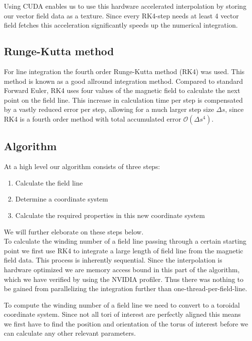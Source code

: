 \documentclass{article}
\renewcommand{\O}[1]{\ensuremath{\mathcal{O}\left(#1\right)}}
\begin{document}
Using CUDA enables us to use this hardware accelerated interpolation by storing our vector field data as a texture. Since every RK4-step needs at least 4 vector field fetches this acceleration significantly speeds up the numerical integration. %

\subsection{Runge-Kutta method}
For line integration the fourth order Runge-Kutta method (RK4) was used.  This method is known as a good allround integration method. Compared to standard Forward Euler, RK4 uses four values of the magnetic field to calculate the next point on the field line. This increase in calculation time per step is compensated by a vastly reduced error per step, allowing for a much larger step size $\Delta s$, since RK4 is a fourth order method with total accumulated error $\O{\Delta s^4}$.

\subsection{Algorithm}
At a high level our algorithm consists of three steps: 
\begin{enumerate}
	\item Calculate the field line
	\item Determine a coordinate system
	\item Calculate the required properties in this new coordinate system
\end{enumerate}
We will further eleborate on these steps below.\\

To calculate the winding number of a field line passing through a certain starting point we first use RK4 to integrate a large length of field line from the magnetic field data. This process is inherently sequential.
Since the interpolation is hardware optimized we are memory access bound in this part of the algorithm, which we have verified by using the NVIDIA profiler. Thus there was nothing to be gained from parallelizing the integration further than one-thread-per-field-line.

To compute the winding number of a field line we need to convert to a toroidal coordinate system. Since not all tori of interest are perfectly aligned this means we first have to find the position and orientation of the torus of interest before we can calculate any other relevant parameters.
\end{document}
